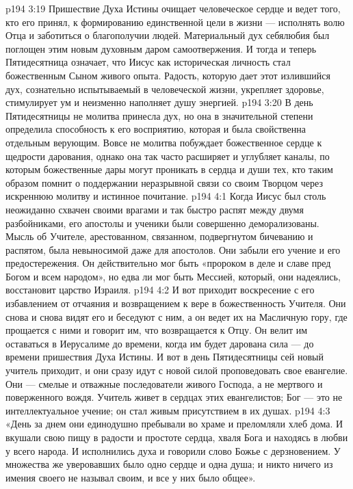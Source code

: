 \vs p194 3:19 Пришествие Духа Истины очищает человеческое сердце и ведет того, кто его принял, к формированию единственной цели в жизни --- исполнять волю Отца и заботиться о благополучии людей. Материальный дух себялюбия был поглощен этим новым духовным даром самоотвержения. И тогда и теперь Пятидесятница означает, что Иисус как историческая личность стал божественным Сыном живого опыта. Радость, которую дает этот излившийся дух, сознательно испытываемый в человеческой жизни, укрепляет здоровье, стимулирует ум и неизменно наполняет душу энергией.
\vs p194 3:20 \pc В день Пятидесятницы не молитва принесла дух, но она в значительной степени определила способность к его восприятию, которая и была свойственна отдельным верующим. Вовсе не молитва побуждает божественное сердце к щедрости дарования, однако она так часто расширяет и углубляет каналы, по которым божественные дары могут проникать в сердца и души тех, кто таким образом помнит о поддержании неразрывной связи со своим Творцом через искреннюю молитву и истинное почитание.
\vs p194 4:1 Когда Иисус был столь неожиданно схвачен своими врагами и так быстро распят между двумя разбойниками, его апостолы и ученики были совершенно деморализованы. Мысль об Учителе, арестованном, связанном, подвергнутом бичеванию и распятом, была невыносимой даже для апостолов. Они забыли его учение и его предостережения. Он действительно мог быть «пророком в деле и славе пред Богом и всем народом», но едва ли мог быть Мессией, который, они надеялись, восстановит царство Израиля.
\vs p194 4:2 И вот приходит воскресение с его избавлением от отчаяния и возвращением к вере в божественность Учителя. Они снова и снова видят его и беседуют с ним, а он ведет их на Масличную гору, где прощается с ними и говорит им, что возвращается к Отцу. Он велит им оставаться в Иерусалиме до времени, когда им будет дарована сила --- до времени пришествия Духа Истины. И вот в день Пятидесятницы сей новый учитель приходит, и они сразу идут с новой силой проповедовать свое евангелие. Они --- смелые и отважные последователи живого Господа, а не мертвого и поверженного вождя. Учитель живет в сердцах этих евангелистов; Бог --- это не интеллектуальное учение; он стал живым присутствием в их душах.
\vs p194 4:3 «День за днем они единодушно пребывали во храме и преломляли хлеб дома. И вкушали свою пищу в радости и простоте сердца, хваля Бога и находясь в любви у всего народа. И исполнились духа и говорили слово Божье с дерзновением. У множества же уверовавших было одно сердце и одна душа; и никто ничего из имения своего не называл своим, и все у них было общее».
